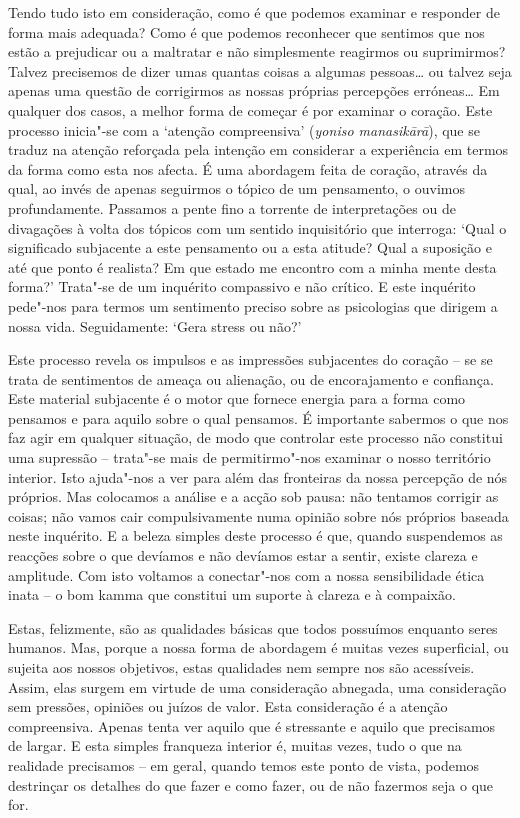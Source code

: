 Tendo tudo isto em consideração, como é que podemos examinar e responder de
forma mais adequada? Como é que podemos reconhecer que sentimos que nos estão a
prejudicar ou a maltratar e não simplesmente reagirmos ou suprimirmos? Talvez
precisemos de dizer umas quantas coisas a algumas pessoas\ldots{} ou talvez seja
apenas uma questão de corrigirmos as nossas próprias percepções erróneas\ldots{}
Em qualquer dos casos, a melhor forma de começar é por examinar o coração. Este
processo inicia"-se com a `atenção compreensiva' (\emph{yoniso manasikārā}), que
se traduz na atenção reforçada pela intenção em considerar a experiência em
termos da forma como esta nos afecta. É uma abordagem feita de coração, através
da qual, ao invés de apenas seguirmos o tópico de um pensamento, o ouvimos
profundamente. Passamos a pente fino a torrente de interpretações ou de
divagações à volta dos tópicos com um sentido inquisitório que interroga: `Qual
o significado subjacente a este pensamento ou a esta atitude? Qual a suposição e
até que ponto é realista? Em que estado me encontro com a minha mente desta
forma?' Trata"-se de um inquérito compassivo e não crítico. E este inquérito
pede"-nos para termos um sentimento preciso sobre as psicologias que dirigem a
nossa vida. Seguidamente: `Gera stress ou não?'

Este processo revela os impulsos e as impressões subjacentes do coração -- se se
trata de sentimentos de ameaça ou alienação, ou de encorajamento e confiança.
Este material subjacente é o motor que fornece energia para a forma como
pensamos e para aquilo sobre o qual pensamos. É importante sabermos o que nos
faz agir em qualquer situação, de modo que controlar este processo não constitui
uma supressão -- trata"-se mais de permitirmo"-nos examinar o nosso território
interior. Isto ajuda"-nos a ver para além das fronteiras da nossa percepção de
nós próprios. Mas colocamos a análise e a acção sob pausa: não tentamos corrigir
as coisas; não vamos cair compulsivamente numa opinião sobre nós próprios
baseada neste inquérito. E a beleza simples deste processo é que, quando
suspendemos as reacções sobre o que devíamos e não devíamos estar a sentir,
existe clareza e amplitude. Com isto voltamos a conectar"-nos com a nossa
sensibilidade ética inata -- o bom kamma que constitui um suporte à clareza e à
compaixão.

Estas, felizmente, são as qualidades básicas que todos possuímos enquanto seres
humanos. Mas, porque a nossa forma de abordagem é muitas vezes superficial, ou
sujeita aos nossos objetivos, estas qualidades nem sempre nos são acessíveis.
Assim, elas surgem em virtude de uma consideração abnegada, uma consideração sem
pressões, opiniões ou juízos de valor. Esta consideração é a atenção
compreensiva. Apenas tenta ver aquilo que é stressante e aquilo que precisamos
de largar. E esta simples franqueza interior é, muitas vezes, tudo o que na
realidade precisamos -- em geral, quando temos este ponto de vista, podemos
destrinçar os detalhes do que fazer e como fazer, ou de não fazermos seja o que
for.

